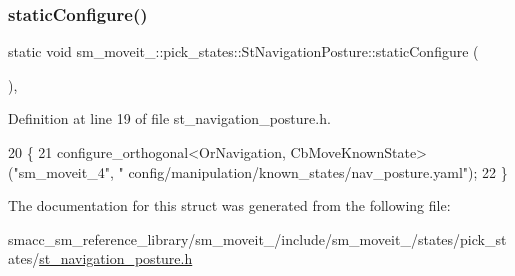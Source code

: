 \mbox{\label{structsm__moveit__4_1_1pick__states_1_1StNavigationPosture_a5b68787c63c17d99ab1e51d8d47b0e9f}} 
\subsubsection{\texorpdfstring{static\+Configure()}{staticConfigure()}}
{\footnotesize\ttfamily static void sm\+\_\+moveit\+\_\+::pick\+\_\+states\+::\+St\+Navigation\+Posture\+::static\+Configure (\begin{DoxyParamCaption}{ }\end{DoxyParamCaption})\hspace{0.3cm}{\ttfamily [inline]}, {\ttfamily [static]}}



Definition at line 19 of file st\+\_\+navigation\+\_\+posture.\+h.


\begin{DoxyCode}
20     \{
21         configure\_orthogonal<OrNavigation, CbMoveKnownState>(\textcolor{stringliteral}{"sm\_moveit\_4"}, \textcolor{stringliteral}{"
      config/manipulation/known\_states/nav\_posture.yaml"});
22     \}
\end{DoxyCode}


The documentation for this struct was generated from the following file\+:\begin{DoxyCompactItemize}
\item 
smacc\+\_\+sm\+\_\+reference\+\_\+library/sm\+\_\+moveit\+\_/include/sm\+\_\+moveit\+\_/states/pick\+\_\+states/\hyperlink{4_2include_2sm__moveit__4_2states_2pick__states_2st__navigation__posture_8h}{st\+\_\+navigation\+\_\+posture.\+h}\end{DoxyCompactItemize}
